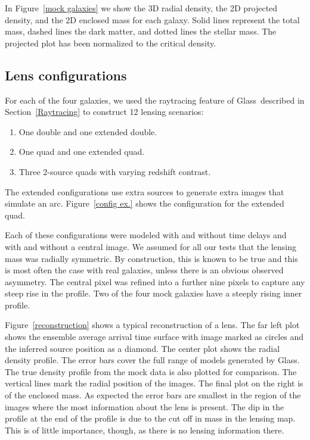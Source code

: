 \documentclass[onecolumn,galley]{mn2e}
\newcommand{\Glass}{{\sc Glass}}
\newcommand{\figref}[1] {Figure~\ref{#1}}
\newcommand{\secref}[1] {Section~\ref{#1}}
\begin{document}
In \figref{mock galaxies} we show the 3D radial density, 
the 2D projected density, and the 2D enclosed mass for each
galaxy. Solid lines represent the total mass, dashed lines the dark 
matter, and dotted lines the stellar mass. The projected plot has
been normalized to the critical density.

\subsection{Lens configurations} %

For each of the four galaxies, we used the raytracing feature of \Glass\
described in \secref{Raytracing} to construct 12 lensing scenarios:

\begin{enumerate}
\item One double and one extended double.
\item One quad and one extended quad.
\item Three 2-source quads with varying redshift contrast.
\end{enumerate}

The extended configurations use extra sources to generate extra images that
simulate an arc. \figref{config ex.} shows the configuration for the extended
quad.

Each of these configurations were modeled with and without time delays and with
and without a central image. We assumed for all our tests that the lensing mass
was radially symmetric. By construction, this is known to be true and this is
most often the case with real galaxies, unless there is an obvious observed
asymmetry. The central pixel was refined into a further nine pixels to capture
any steep rise in the profile. Two of the four mock galaxies have a steeply rising
inner profile.

\figref{reconstruction} shows a typical reconstruction of a
lens. The far left plot shows the ensemble average arrival time surface with
image marked as circles and the inferred source position as a diamond. The
center plot shows the radial density profile. The error bars cover the full
range of models generated by \Glass. The true density profile from the mock
data is also plotted for comparison. The vertical lines mark the radial
position of the images. The final plot on the right is of the enclosed mass. As
expected the error bars are smallest in the region of the images where the most
information about the lens is present. The dip in the profile at the end of the
profile is due to the cut off in mass in the lensing map. This is of little
importance, though, as there is no lensing information there.
\end{document}
